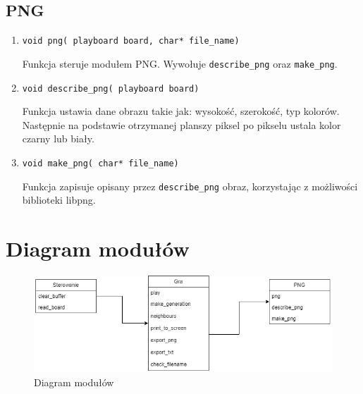 \documentclass[12pt]{report}
\newcommand{\code}[1]{\texttt{#1}}
\begin{document}
\subsection{PNG}
\begin{enumerate}
    \item \code{void png( playboard board, char* file\_name)}\par
    Funkcja steruje modułem PNG. Wywołuje \code{describe\_png} oraz \code{make\_png}.
    \item \code{void describe\_png( playboard board)}\par
    Funkcja ustawia dane obrazu takie jak: wysokość, szerokość, typ kolorów. Następnie na podstawie otrzymanej planszy piksel po pikselu ustala kolor czarny lub biały.
    \item \code{void make\_png( char* file\_name)}\par
    Funkcja zapisuje opisany przez \code{describe\_png} obraz, korzystając z możliwości biblioteki libpng.
\end{enumerate}
\section{Diagram modułów}
\begin{figure}[htp]
\centering
\includegraphics[width=16cm]{diagram.png}
\caption{Diagram modułów}
\label{diagram}
\end{figure}
\end{document}
